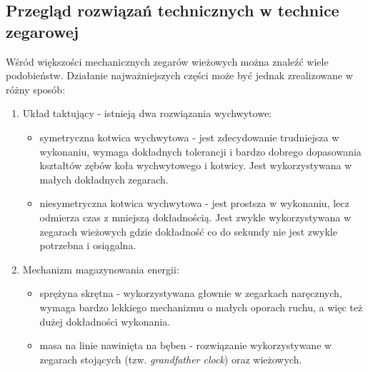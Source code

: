         \subsection{Przegląd rozwiązań technicznych w technice zegarowej}
        Wśród większości mechanicznych zegarów wieżowych można znaleźć wiele podobieństw.
        Działanie najważniejszych części może być jednak zrealizowane w różny sposób:
        \begin{enumerate}
        	\item Układ taktujący - istnieją dwa rozwiązania wychwytowe:
        	\begin{itemize}
        		\item symetryczna kotwica wychwytowa - jest zdecydowanie trudniejsza w wykonaniu, wymaga dokładnych tolerancji i bardzo dobrego dopasowania kształtów zębów koła wychwytowego i kotwicy. Jest wykorzystywana w małych dokładnych zegarach.
        		\item niesymetryczna kotwica wychwytowa - jest prostsza w wykonaniu, lecz odmierza czas z mniejszą dokładnością. Jest zwykle wykorzystywana w zegarach wieżowych gdzie dokładność co do sekundy nie jest zwykle potrzebna i osiągalna.
        	\end{itemize}
        \item Mechanizm magazynowania energii:
			\begin{itemize}
				\item sprężyna skrętna - wykorzystywana głownie w zegarkach naręcznych, wymaga bardzo lekkiego mechanizmu o małych oporach ruchu, a więc też dużej dokładności wykonania.
				\item masa na linie nawinięta na bęben - rozwiązanie wykorzystywane w zegarach stojących (tzw. \textit{grandfather clock}) oraz wieżowych.
			\end{itemize}
       	\end{enumerate}	
		
